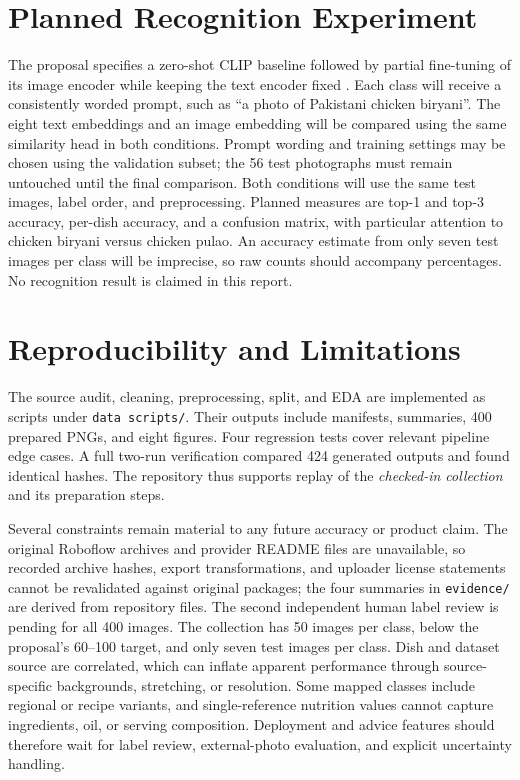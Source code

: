 \documentclass[11pt,a4paper]{article}
\begin{document}
\section{Planned Recognition Experiment}
The proposal specifies a zero-shot CLIP baseline followed by partial fine-tuning of its image encoder while keeping the text encoder fixed \cite{clip}. Each class will receive a consistently worded prompt, such as ``a photo of Pakistani chicken biryani''. The eight text embeddings and an image embedding will be compared using the same similarity head in both conditions. Prompt wording and training settings may be chosen using the validation subset; the 56 test photographs must remain untouched until the final comparison. Both conditions will use the same test images, label order, and preprocessing. Planned measures are top-1 and top-3 accuracy, per-dish accuracy, and a confusion matrix, with particular attention to chicken biryani versus chicken pulao. An accuracy estimate from only seven test images per class will be imprecise, so raw counts should accompany percentages. No recognition result is claimed in this report.

\section{Reproducibility and Limitations}
The source audit, cleaning, preprocessing, split, and EDA are implemented as scripts under \texttt{data scripts/}. Their outputs include manifests, summaries, 400 prepared PNGs, and eight figures. Four regression tests cover relevant pipeline edge cases. A full two-run verification compared 424 generated outputs and found identical hashes. The repository thus supports replay of the \emph{checked-in collection} and its preparation steps.

Several constraints remain material to any future accuracy or product claim. The original Roboflow archives and provider README files are unavailable, so recorded archive hashes, export transformations, and uploader license statements cannot be revalidated against original packages; the four summaries in \texttt{evidence/} are derived from repository files. The second independent human label review is pending for all 400 images. The collection has 50 images per class, below the proposal's 60--100 target, and only seven test images per class. Dish and dataset source are correlated, which can inflate apparent performance through source-specific backgrounds, stretching, or resolution. Some mapped classes include regional or recipe variants, and single-reference nutrition values cannot capture ingredients, oil, or serving composition. Deployment and advice features should therefore wait for label review, external-photo evaluation, and explicit uncertainty handling.
\end{document}
